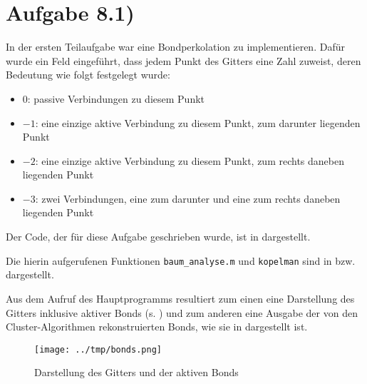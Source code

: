 \section*{Aufgabe 8.1)}
In der ersten Teilaufgabe war eine Bondperkolation zu implementieren. Dafür wurde
ein Feld eingeführt, dass jedem Punkt des Gitters eine Zahl zuweist, deren Bedeutung
wie folgt festgelegt wurde:
\begin{itemize}
\item $0$: passive Verbindungen zu diesem Punkt
\item $-1$: eine einzige aktive Verbindung zu diesem Punkt, zum darunter liegenden Punkt
\item $-2$: eine einzige aktive Verbindung zu diesem Punkt, zum rechts daneben liegenden Punkt
\item $-3$: zwei Verbindungen, eine zum darunter und eine zum rechts daneben liegenden Punkt
\end{itemize}

Der Code, der für diese Aufgabe geschrieben wurde, ist in  dargestellt.



Die hierin aufgerufenen Funktionen \texttt{baum\_analyse.m} und \texttt{kopelman} sind in  bzw.  dargestellt.




Aus dem Aufruf des Hauptprogramms resultiert zum einen eine Darstellung des Gitters
inklusive aktiver Bonds (s. ) und zum anderen eine Ausgabe der von den
Cluster-Algorithmen rekonstruierten Bonds, wie sie in  dargestellt ist.

\begin{figure}[htb]
  \centering
  \texttt{[image: ../tmp/bonds.png]}
  \caption{Darstellung des Gitters und der aktiven Bonds}
  \label{fig:bonds}
\end{figure}

